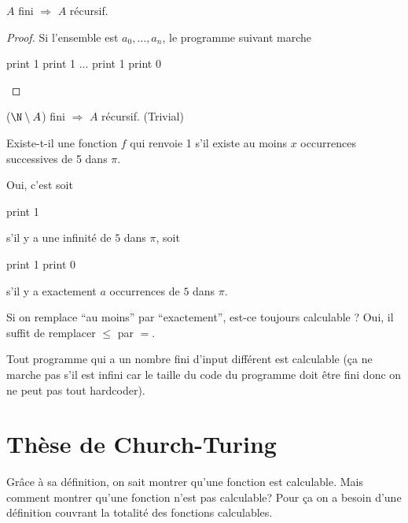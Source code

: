 \begin{myprop}
	$A$ fini $\Rightarrow$ $A$ récursif.
    \begin{proof}
      Si l'ensemble est $a_0, \ldots, a_n$, le programme suivant marche
      \begin{algorithmic}
        \STATE print 1
        \STATE print 1
        \STATE ...
        \STATE print 1
        \ELSE
        \STATE print 0
        \ENDIF
      \end{algorithmic}
    \end{proof}
\end{myprop}

\begin{myprop}
	($\N \setminus A$) fini $\Rightarrow$ $A$ récursif. (Trivial)
\end{myprop}

\begin{myexem}
  Existe-t-il une fonction $f$ qui renvoie 1 s'il existe au moins $x$ occurrences successives de 5 dans $\pi$.

  Oui, c'est soit
  \begin{algorithmic}
    \STATE print 1
  \end{algorithmic}
  s'il y a une infinité de $5$ dans $\pi$,
  soit
  \begin{algorithmic}
    \STATE print 1
    \ELSE
    \STATE print 0
    \ENDIF
  \end{algorithmic}
  s'il y a exactement $a$ occurrences de $5$ dans $\pi$.

  Si on remplace ``au moins'' par ``exactement'', est-ce toujours calculable ?
  Oui, il suffit de remplacer $\leq$ par $=$.
\end{myexem}

\begin{myprop}
  Tout programme qui a un nombre fini d'input différent est calculable (ça ne marche pas s'il est infini car le taille du code du programme doit être fini donc on ne peut pas tout hardcoder).
\end{myprop}


\section{Thèse de Church-Turing}
\label{sec:th_se_de_church_turing}
Grâce à sa définition, on sait montrer qu'une fonction est calculable. Mais comment
montrer qu'une fonction n'est pas calculable? Pour ça on a besoin d'une définition
couvrant la totalité des fonctions calculables.


